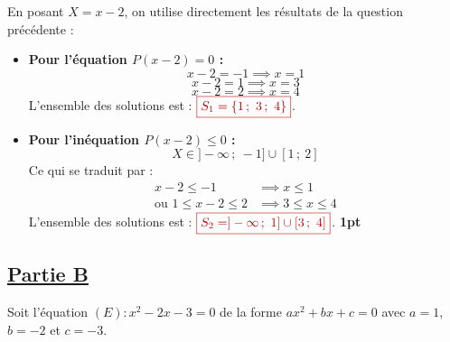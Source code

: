\documentclass[12pt,a4paper]{article}
\newcommand{\redtitle}[1]{\textcolor{myred}{\textbf{#1}}}
\newcommand{\redbox}[1]{\color{myred}\boxed{#1}\color{black}}
\begin{document}
\begin{enumerate}
\begin{enumerate}
        En posant $X = x - 2$, on utilise directement les résultats de la question précédente :
        
        \begin{itemize}
            \item \textbf{Pour l'équation $P(x-2) = 0$ :}
            \[
            x - 2 = -1 \implies x = 1
            \]
            \[
            x - 2 = 1 \implies x = 3
            \]
            \[
            x - 2 = 2 \implies x = 4
            \]
            L'ensemble des solutions est : $\redbox{S_1 = \{1 \,;~ 3 \,;~ 4\}}$.
            
            \item \textbf{Pour l'inéquation $P(x-2) \leq 0$ :}
            \[ X \in ]-\infty \,;~ -1] \cup [1 \,;~ 2] \]
            Ce qui se traduit par :
            \begin{align*}
                x - 2 \le -1 &\implies x \le 1 \\
                \text{ou } 1 \le x - 2 \le 2 &\implies 3 \le x \le 4
            \end{align*}
            L'ensemble des solutions est : $\redbox{S_2 = ]-\infty \,;~ 1] \cup [3 \,;~ 4]}$. \hfill \textbf{1pt}
        \end{itemize}
    \end{enumerate}
\end{enumerate}

\subsection*{\underline{\redtitle{Partie B}}}

Soit l'équation $(E) : x^2 - 2x - 3 = 0$ de la forme $ax^2 + bx + c = 0$ avec $a=1$, $b=-2$ et $c=-3$.
\end{document}
